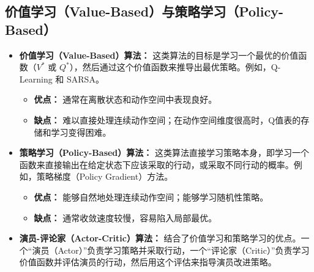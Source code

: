 \subsection{价值学习（Value-Based）与策略学习（Policy-Based）}
\begin{itemize}
    \item \textbf{价值学习（Value-Based）算法：} 这类算法的目标是学习一个最优的价值函数（$V^*$ 或 $Q^*$），然后通过这个价值函数来推导出最优策略。例如，Q-Learning 和 SARSA。
        \begin{itemize}
            \item \textbf{优点：} 通常在离散状态和动作空间中表现良好。
            \item \textbf{缺点：} 难以直接处理连续动作空间；在动作空间维度很高时，Q值表的存储和学习变得困难。
        \end{itemize}
    \item \textbf{策略学习（Policy-Based）算法：} 这类算法直接学习策略本身，即学习一个函数来直接输出在给定状态下应该采取的行动，或采取不同行动的概率。例如，策略梯度（Policy Gradient）方法。
        \begin{itemize}
            \item \textbf{优点：} 能够自然地处理连续动作空间；能够学习随机性策略。
            \item \textbf{缺点：} 通常收敛速度较慢，容易陷入局部最优。
        \end{itemize}
    \item \textbf{演员-评论家（Actor-Critic）算法：} 结合了价值学习和策略学习的优点。一个“演员（Actor）”负责学习策略并采取行动，一个“评论家（Critic）”负责学习价值函数并评估演员的行动，然后用这个评估来指导演员改进策略。
\end{itemize}

